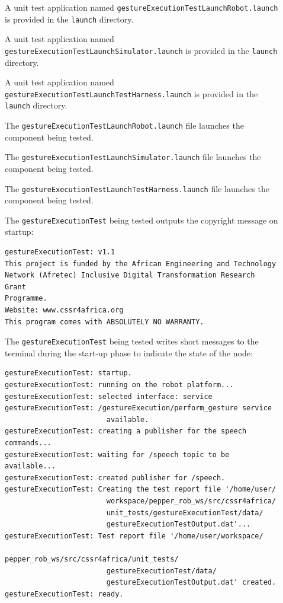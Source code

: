 \documentclass{CSSRforAfrica}
\newcommand{\checkboxChecked}{\fbox{\ding{51}}} %
\newcommand{\checkboxDashed}{\fbox{--}}         %
\begin{document}
\begin{description}
\item[\checkboxChecked] A unit test application named {\small \verb+gestureExecutionTestLaunchRobot.launch+} is provided in the {\small \verb+launch+} directory. 

\item[\checkboxDashed] A unit test application named {\small \verb+gestureExecutionTestLaunchSimulator.launch+} is provided in the {\small \verb+launch+} directory. 

\item[\checkboxChecked] A unit test application named {\small \verb+gestureExecutionTestLaunchTestHarness.launch+} is provided in the {\small \verb+launch+} directory. 

\item[\checkboxChecked] The {\small \verb+gestureExecutionTestLaunchRobot.launch+} file  launches the component being tested.

\item[\checkboxDashed] The {\small \verb+gestureExecutionTestLaunchSimulator.launch+} file  launches the component being tested.

\item[\checkboxChecked] The {\small \verb+gestureExecutionTestLaunchTestHarness.launch+} file  launches the component being tested.

\item[\checkboxChecked]  The {\small \verb+gestureExecutionTest+} being tested outputs the copyright message on startup:
\begin{verbatim}
gestureExecutionTest: v1.1
This project is funded by the African Engineering and Technology
Network (Afretec) Inclusive Digital Transformation Research Grant
Programme. 
Website: www.cssr4africa.org
This program comes with ABSOLUTELY NO WARRANTY.
\end{verbatim}

\item[\checkboxChecked]  The {\small \verb+gestureExecutionTest+} being tested writes short messages to the terminal during the start-up phase to
 indicate the state of the node:
\begin{verbatim}
gestureExecutionTest: startup.
gestureExecutionTest: running on the robot platform...
gestureExecutionTest: selected interface: service
gestureExecutionTest: /gestureExecution/perform_gesture service
                        available.
gestureExecutionTest: creating a publisher for the speech commands...
gestureExecutionTest: waiting for /speech topic to be available...
gestureExecutionTest: created publisher for /speech.
gestureExecutionTest: Creating the test report file '/home/user/
                        workspace/pepper_rob_ws/src/cssr4africa/
                        unit_tests/gestureExecutionTest/data/
                        gestureExecutionTestOutput.dat'...
gestureExecutionTest: Test report file '/home/user/workspace/
                        pepper_rob_ws/src/cssr4africa/unit_tests/
                        gestureExecutionTest/data/
                        gestureExecutionTestOutput.dat' created.
gestureExecutionTest: ready.
\end{verbatim}


\end{description}
\end{document}
